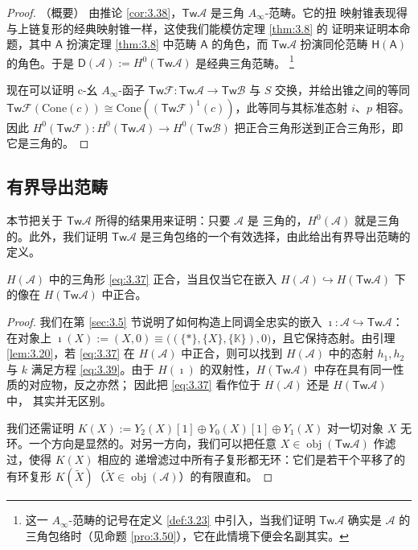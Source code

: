 \begin{proof}（概要）
由推论 \ref{cor:3.38}，$\mathsf{Tw}\mathcal A$ 是三角 $A_\infty$-范畴。它的扭
映射锥表现得与上链复形的经典映射锥一样，这使我们能模仿定理 \ref{thm:3.8} 的
证明来证明本命题，其中 $\mathsf A$ 扮演定理 \ref{thm:3.8} 中范畴
$\mathsf A$ 的角色，而 $\mathsf{Tw}\mathcal A$ 扮演同伦范畴
$\mathsf H(\mathsf A)$ 的角色。于是
$\mathsf D(\mathcal A):=H^0(\mathsf{Tw}\mathcal A)$ 是经典三角范畴。%
\footnote{这一 $A_\infty$-范畴的记号在定义 \ref{def:3.23} 中引入，当我们证明
$\mathsf{Tw}\mathcal A$ 确实是 $\mathcal A$ 的三角包络时（见命题
\ref{pro:3.50}），它在此情境下便会名副其实。}

现在可以证明 c-幺 $A_\infty$-函子
$\mathsf{Tw}\mathcal F:\mathsf{Tw}\mathcal A\to\mathsf{Tw}\mathcal B$ 与 $S$
交换，并给出锥之间的等同
$\mathsf{Tw}\mathcal F(\mathrm{Cone}(c))\cong
\mathrm{Cone}((\mathsf{Tw}\mathcal F)^1(c))$，此等同与其标准态射 $i$、$p$
相容。因此 $H^0(\mathsf{Tw}\mathcal F):H^0(\mathsf{Tw}\mathcal A)\to
H^0(\mathsf{Tw}\mathcal B)$ 把正合三角形送到正合三角形，即它是三角的。
\end{proof}

\subsection{有界导出范畴}\label{sec:3.6}

本节把关于 $\mathsf{Tw}\mathcal A$ 所得的结果用来证明：只要 $\mathcal A$ 是
三角的，$H^0(\mathcal A)$ 就是三角的。此外，我们证明
$\mathsf{Tw}\mathcal A$ 是三角包络的一个有效选择，由此给出有界导出范畴的定义。

\begin{Lem}\label{lem:3.40}
$H(\mathcal A)$ 中的三角形 \eqref{eq:3.37} 正合，当且仅当它在嵌入
$H(\mathcal A)\hookrightarrow H(\mathsf{Tw}\mathcal A)$ 下的像在
$H(\mathsf{Tw}\mathcal A)$ 中正合。
\end{Lem}

\begin{proof}
我们在第 \ref{sec:3.5} 节说明了如何构造上同调全忠实的嵌入
$\imath:\mathcal A\hookrightarrow\mathsf{Tw}\mathcal A$：在对象上
$\imath(X):=(X,0)\equiv\bigl((\{*\},\{X\},\{\mathbb K\}),0\bigr)$，且它保持态射。由引理
\ref{lem:3.20}，若 \eqref{eq:3.37} 在 $H(\mathcal A)$ 中正合，则可以找到
$H(\mathcal A)$ 中的态射 $h_1,h_2$ 与 $k$ 满足方程 \eqref{eq:3.39}。由于 $H(\imath)$
的双射性，$H(\mathsf{Tw}\mathcal A)$ 中存在具有同一性质的对应物，反之亦然；
因此把 \eqref{eq:3.37} 看作位于 $H(\mathcal A)$ 还是 $H(\mathsf{Tw}\mathcal A)$ 中，
其实并无区别。

我们还需证明 $K(X):=Y_2(X)[1]\oplus Y_0(X)[1]\oplus Y_1(X)$ 对一切对象
$X$ 无环。一个方向是显然的。对另一方向，我们可以把任意
$X\in\operatorname{obj}(\mathsf{Tw}\mathcal A)$ 作滤过，使得 $K(X)$ 相应的
递增滤过中所有子复形都无环：它们是若干个平移了的有环复形
$K(\tilde X)$（$\tilde X\in\operatorname{obj}(\mathcal A)$）的有限直和。
\end{proof}

